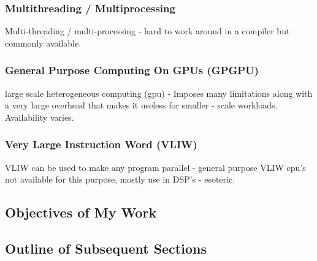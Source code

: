 \subsubsection{Multithreading / Multiprocessing}

\begin{sectionplan}
     Multi-threading / multi-processing - hard to work around in a compiler but
commonly available.
\end{sectionplan}
\subsubsection{General Purpose Computing On GPUs (GPGPU)}

\begin{sectionplan}
     large scale heterogeneous computing (gpu) - Imposes many limitations along
with a very large overhead that makes it useless for smaller - scale workloads.
Availability varies.
\end{sectionplan}

\subsubsection{Very Large Instruction Word (VLIW)}
\begin{sectionplan}
     VLIW can be used to make any program parallel - general purpose VLIW cpu's
not available for this purpose, mostly use in DSP's - esoteric.
\end{sectionplan}

\subsection{Objectives of My Work}

\subsection{Outline of Subsequent Sections}

